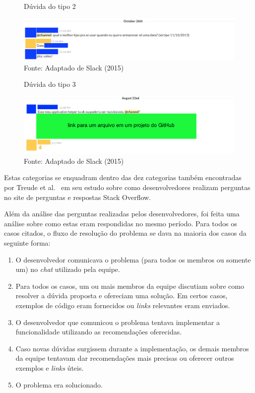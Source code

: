 \begin{figure}[h]
	\centering
    \caption{Dúvida do tipo 2}
    \includegraphics[width=15cm]{Imagens/c-type-2-1-1.png}
	\caption*{Fonte: Adaptado de Slack (2015)}
\end{figure}

\begin{figure}[h]
	\centering
    \caption{Dúvida do tipo 3}
    \includegraphics[width=15cm]{Imagens/c-type-3-1-1.png}
	\caption*{Fonte: Adaptado de Slack (2015)}
\end{figure}

Estas categorias se enquadram dentro das dez categorias também encontradas por Treude et al.~\cite{Treude2011} em seu estudo sobre como desenvolvedores realizam perguntas no site de perguntas e respostas Stack Overflow.

\clearpage

Além da análise das perguntas realizadas pelos desenvolvedores, foi feita uma análise sobre como estas eram respondidas no mesmo período. Para todos os casos citados, o fluxo de resolução do problema se dava na maioria dos casos da seguinte forma:

\begin{enumerate}[i]
  \item O desenvolvedor comunicava o problema (para todos os membros ou somente um) no \textit{chat} utilizado pela equipe.
  \item Para todos os casos, um ou mais membros da equipe discutiam sobre como resolver a dúvida proposta e ofereciam uma solução. Em certos casos, exemplos de código eram fornecidos ou \textit{links} relevantes eram enviados.
  \item O desenvolvedor que comunicou o problema tentava implementar a funcionalidade utilizando as recomendações oferecidas.
  \item Caso novas dúvidas surgissem durante a implementação, os demais membros da equipe tentavam dar recomendações mais precisas ou oferecer outros exemplos e \textit{links} úteis.
  \item O problema era solucionado.
\end{enumerate}


